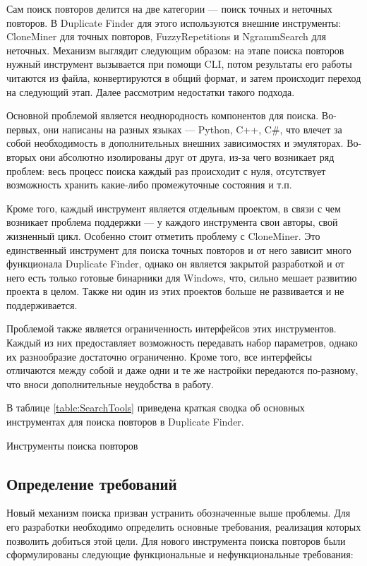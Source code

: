 \documentclass[14pt]{matmex-diploma-custom}
\begin{document}
Сам поиск повторов делится на две категории --- поиск точных и неточных повторов. В Duplicate Finder для этого используются внешние инструменты: CloneMiner \cite{bib:tool:CloneMiner} для точных повторов, FuzzyRepetitions \cite{bib:tool:FuzzySearch} и NgrammSearch \cite{bib:tool:ImprovedNgramSearch} для неточных. Механизм выглядит следующим образом: на этапе поиска повторов нужный инструмент вызывается при помощи CLI, потом результаты его работы читаются из файла, конвертируются в общий формат, и затем происходит переход на следующий этап. Далее рассмотрим недостатки такого подхода.

Основной проблемой является неоднородность компонентов для поиска. Во-первых, они написаны на разных языках --- Python, C++, C\#, что влечет за собой необходимость в дополнительных внешних зависимостях и эмуляторах. Во-вторых они абсолютно изолированы друг от друга, из-за чего возникает ряд проблем: весь процесс поиска каждый раз происходит с нуля, отсутствует возможность хранить какие-либо промежуточные состояния и т.п.

Кроме того, каждый инструмент является отдельным проектом, в связи с чем возникает проблема поддержки ---  у каждого инструмента свои авторы, свой жизненный цикл. Особенно стоит отметить проблему с CloneMiner. Это единственный инструмент для поиска точных повторов и от него зависит много функционала Duplicate Finder, однако он является закрытой разработкой и от него есть только готовые бинарники для Windows, что, сильно мешает развитию проекта в целом. Также ни один из этих проектов больше не развивается и не поддерживается.

Проблемой также является ограниченность интерфейсов этих инструментов. Каждый из них предоставляет возможность передавать набор параметров, однако их разнообразие достаточно ограниченно. Кроме того, все интерфейсы отличаются между собой и даже одни и те же настройки передаются по-разному, что вноси дополнительные неудобства в работу.


В таблице \ref{table:SearchTools} приведена краткая сводка об основных инструментах для поиска повторов в Duplicate Finder.

\begin{table}[h!]
	\centering
	
	\caption{Инструменты поиска повторов}
	\label{table:SearchTools}
\end{table}

\subsection{Определение требований}
Новый механизм поиска призван устранить обозначенные выше проблемы. Для его разработки необходимо определить основные требования, реализация которых позволить добиться этой цели. Для нового инструмента поиска повторов были сформулированы следующие функциональные и нефункциональные требования:
\end{document}
